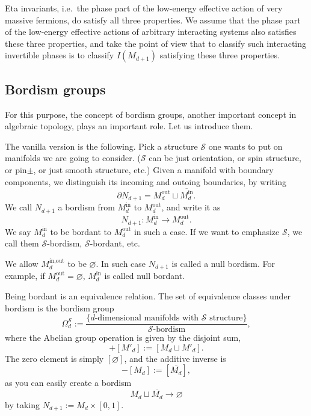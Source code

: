 \documentclass[12pt]{article}
\numberwithin{equation}{section}
\numberwithin{figure}{section}
\theoremstyle{remark}
\def\cS{\mathcal{S}}
\begin{document}
Eta invariants, i.e.~the phase part of the low-energy effective action of very massive fermions,
do satisfy all three properties.
We assume that the phase part of the low-energy effective actions
of arbitrary interacting systems also satisfies these three properties,
and take the point of view that to classify such interacting invertible phases
is to classify $I(M_{d+1})$ satisfying these three properties.

\subsection{Bordism groups}
For this purpose, the concept of bordism groups, another important concept in algebraic topology, plays an important role.
Let us introduce them.

The vanilla version is the following.
Pick a structure $\cS$ one wants to put on manifolds we are going to consider.
($\cS$ can be just orientation, or spin structure, or pin$\pm$, or just smooth structure, etc.)
Given a manifold with boundary components, we distinguish its incoming and outoing boundaries,
by writing \begin{equation}
\partial N_{d+1}= M_d^\text{out} \sqcup \overline{M_d^\text{in}}.
\end{equation}
We call $N_{d+1}$ a bordism from $M_d^\text{in}$ to $M_d^\text{out}$, and write it as \begin{equation}
N_{d+1} \colon M_d^\text{in} \to M_d^\text{out}.
\end{equation}
We say $M_d^\text{in}$ to be bordant to $M_d^\text{out}$ in such a case.
If we want to emphasize $\cS$, we call them $\cS$-bordism, $\cS$-bordant, etc.

We allow $M_d^\text{in,out}$ to be $\varnothing$. 
In such case $N_{d+1}$ is called a null bordism. For example, if $M_d^\text{out}=\varnothing$,
$M_d^\text{in}$ is called null bordant.

Being bordant is an equivalence relation. The set of equivalence classes under bordism is the bordism group \begin{equation}
\Omega^\cS_d := \frac{
\{\text{$d$-dimensional manifolds with $\cS$ structure} \} 
} { \text{$\cS$-bordism} },
\end{equation}
where the Abelian group operation is given by the disjoint sum, \begin{equation}
[M_d] + [M'_d] := [M_d \sqcup M'_d].
\end{equation} 
The zero element is simply $[\varnothing]$,
and the additive inverse is \begin{equation}
-[M_d] := [\overline{M_d}],
\end{equation} as you can easily create a bordism  
\begin{equation}
M_d \sqcup \overline{M_d} \to \varnothing
\end{equation} by taking $N_{d+1}:=M_d \times [0,1]$.
\end{document}
